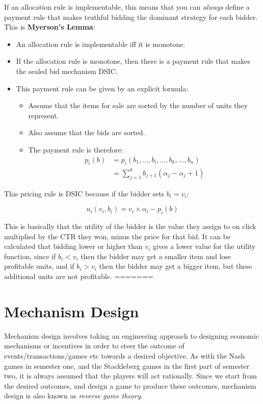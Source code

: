 If an allocation rule is implementable, this means that you can \textit{always}
define a payment rule that makes truthful bidding the dominant strategy for each
bidder. This is \textbf{Myerson's Lemma}:

\begin{itemize}
  \item An allocation rule is implementable iff it is monotone.
  \item If the allocation rule is monotone, then there is a payment rule that
  makes the sealed bid mechanism DSIC.
  \item This payment rule can be given by an explicit formula:
  \begin{itemize}
    \item Assume that the items for sale are sorted by the number of units they
    represent.
    \item Also assume that the bids are sorted.
    \item The payment rule is therefore:
    \[
      \begin{split}
        p_i(b) &= p_i(b_1, \dots, b_i, \dots, b_k, \dots, b_n)\\
               &= \sum^k_{j=1}b_{j+1}(\alpha_j - \alpha_j+1)
      \end{split}
    \]
  \end{itemize}
\end{itemize}

This pricing rule is DSIC because if the bidder sets $b_i = v_i$:

\[
  u_i(v_i, b_i) = v_i \times \alpha_i - p_i(b)
\]

This is basically that the utility of the bidder is the value they assign to on
click multiplied by the CTR they won, minus the price for that bid. It can be
calculated that bidding lower or higher than $v_i$ gives a lower value for the
utility function, since if $b_i < v_i$ then the bidder may get a smaller item
and lose profitable units, and if $b_i > v_i$ then the bidder may get a bigger
item, but these additional units are not profitable.
=======
\section{Mechanism Design}

Mechanism design involves taking an engineering approach to designing
economic mechanisms or incentives in order to steer the outcome of
events/transactions/games etc towards a desired objective. As with the
Nash games in semester one, and the Stackleberg games in the first
part of semester two, it is always assumed that the players will act
rationally. Since we start from the desired outcomes, and design a
game to produce these outcomes, mechanism design is also known as
\textit{reverse game theory}.

